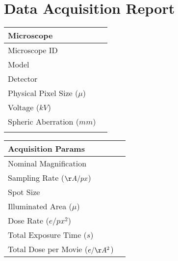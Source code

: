 \documentclass[12pt,a4paper]{article}
\begin{document}
\section*{\\Data Acquisition Report}
\def\arraystretch{1.25}  %
\begin{tabulary}{\linewidth}{L L}
  \hline{}Microscope & \\\hline
  Microscope ID & \\\hline
  Model & \\\hline
  Detector & \\\hline
  Physical Pixel Size ($\mu$) & \\\hline
  Voltage ($kV$)& \\\hline
  Spheric Aberration ($mm$)& \\\hline
  & \\
\end{tabulary}
%
  \hspace{1cm}
%
\begin{tabulary}{\linewidth}{L L}
  \hline
  Acquisition Params &  \\\hline
  Nominal Magnification &  \\\hline
  Sampling Rate ($\AA/px$)& \\\hline
  Spot Size &  \\\hline
  Illuminated Area ($\mu$)& \\\hline
  Dose Rate ($e/px^2$) &
       \\\hline
  Total Exposure Time ($s$)&
       \\\hline
  Total Dose per Movie ($e/\AA^2$)&
       \\\hline

\end{tabulary}\\\\
   \newline
%
\end{document}
